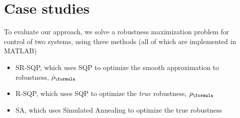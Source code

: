 \section{Case studies}
\label{sec:case study}

To evaluate our approach, we solve a robustness maximization problem for control of two systems, using three methods (all of which are implemented in MATLAB)

\begin{itemize}
	\item SR-SQP, which uses SQP to optimize the smooth approximation to robustness, $\srobf$
	\item R-SQP, which uses SQP to optimize the \textit{true} robustness, $\robf$
	\item SA, which uses Simulated Annealing to optimize the true robustness
\end{itemize}



